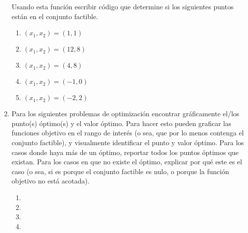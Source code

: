 \documentclass[12pt]{article}
\begin{document}
\begin{enumerate}
    Usando esta función escribir código que determine si los siguientes puntos están en el conjunto factible.
    \begin{enumerate}[label=\alph*)]
        \item $(x_1,x_2) = (1,1)$
        \item $(x_1,x_2) = (12,8)$
        \item $(x_1,x_2) = (4,8)$
        \item $(x_1,x_2) = (-1,0)$
        \item $(x_1,x_2) = (-2,2)$
    \end{enumerate}
    
    \item Para los siguientes problemas de optimización encontrar gráficamente el/los punto(s) óptimo(s) y el valor óptimo. Para hacer esto pueden graficar las funciones objetivo en el rango de interés (o sea, que por lo menos contenga el conjunto factible), y visualmente identificar el punto y valor óptimo. Para los casos donde haya más de un óptimo, reportar todos los puntos óptimos que existan. Para los casos en que no existe el óptimo, explicar por qué este es el caso (o sea, si es porque el conjunto factible es nulo, o porque la función objetivo no está acotada).
    \begin{enumerate}[label=\alph*)]
        \item {}

        \item {}

        \item {}

        \item {}


\end{enumerate}
\end{enumerate}
\end{document}
